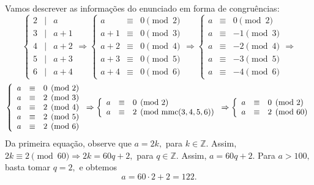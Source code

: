 \documentclass[12pt, a4paper]{article}
\newcommand{\mmc}{{\rm mmc}}
\begin{document}
	\begin{solution}
	Vamos descrever as informações do enunciado em forma de congruências:
\[\left\{\begin{array}{lcr}
     2&\mid&a\\
     3&\mid& a+1\\
     4&\mid& a+2\\
     5&\mid&a+3\\
     6&\mid& a+4
\end{array}\right.\Rightarrow \left\{\begin{array}{lcr}
     a&\equiv&0 \pmod 2\\
     a+1&\equiv&0\pmod 3\\
     a+2&\equiv& 0\pmod 4\\
     a+3&\equiv&0\pmod 5\\
     a+4&\equiv& 0\pmod 6
\end{array}\right.\Rightarrow\left\{\begin{array}{lcr}
     a&\equiv&0 \pmod 2\\
     a&\equiv& -1 \pmod 3\\
     a&\equiv& -2 \pmod 4\\
     a&\equiv&-3 \pmod 5\\
     a&\equiv& -4 \pmod 6
\end{array}\right.\Rightarrow\]\[
\left\{\begin{array}{lcr}
     a&\equiv&0  \pmod 2\\
     a&\equiv&2  \pmod 3\\
     a&\equiv&2  \pmod 4\\
     a&\equiv&2 \pmod 5\\
     a&\equiv&2 \pmod 6
\end{array}\right.\Rightarrow
\left\{\begin{array}{lcl}
    a&\equiv&0 \pmod 2\\
    a&\equiv&2 \pmod{\mmc(3,4,5,6)}
\end{array}\right.\Rightarrow
\left\{\begin{array}{lcl}
    a&\equiv&0 \pmod 2\\
    a&\equiv&2\pmod{60}
\end{array}\right.\]
Da primeira equação, observe que $a = 2k,$ para $k \in \mathbb{Z}.$ Assim, $2k \equiv 2 \pmod{60} \Rightarrow 2k = 60q+2,$ para $q \in \mathbb{Z}.$ Assim, $a = 60q+2.$ Para $a > 100,$ basta tomar $q = 2,$ e obtemos 
\[a = 60 \cdot 2 + 2 = 122.\]
	\end{solution}
\end{document}

